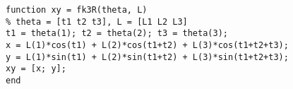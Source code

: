 ﻿%
\begin{lstlisting}[style=code, caption={MATLAB: simple planar FK}, label={lst:fk}]
function xy = fk3R(theta, L)
% theta = [t1 t2 t3], L = [L1 L2 L3]
t1 = theta(1); t2 = theta(2); t3 = theta(3);
x = L(1)*cos(t1) + L(2)*cos(t1+t2) + L(3)*cos(t1+t2+t3);
y = L(1)*sin(t1) + L(2)*sin(t1+t2) + L(3)*sin(t1+t2+t3);
xy = [x; y];
end
\end{lstlisting}

